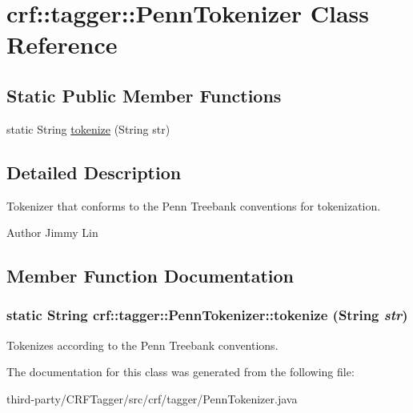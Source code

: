 \hypertarget{classcrf_1_1tagger_1_1PennTokenizer}{
\section{crf::tagger::PennTokenizer Class Reference}
\label{classcrf_1_1tagger_1_1PennTokenizer}
}
\subsection*{Static Public Member Functions}
\begin{DoxyCompactItemize}
\item 
static String \hyperlink{classcrf_1_1tagger_1_1PennTokenizer_a963aa9f5f35478cc41f2ff72acb7ae2b}{tokenize} (String str)
\end{DoxyCompactItemize}


\subsection{Detailed Description}
Tokenizer that conforms to the Penn Treebank conventions for tokenization.

\begin{DoxyAuthor}{Author}
Jimmy Lin 
\end{DoxyAuthor}


\subsection{Member Function Documentation}
\hypertarget{classcrf_1_1tagger_1_1PennTokenizer_a963aa9f5f35478cc41f2ff72acb7ae2b}{
\subsubsection[{tokenize}]{\setlength{\rightskip}{0pt plus 5cm}static String crf::tagger::PennTokenizer::tokenize (String {\em str})}}
\label{classcrf_1_1tagger_1_1PennTokenizer_a963aa9f5f35478cc41f2ff72acb7ae2b}
Tokenizes according to the Penn Treebank conventions. 

The documentation for this class was generated from the following file:\begin{DoxyCompactItemize}
\item 
third-\/party/CRFTagger/src/crf/tagger/PennTokenizer.java\end{DoxyCompactItemize}
